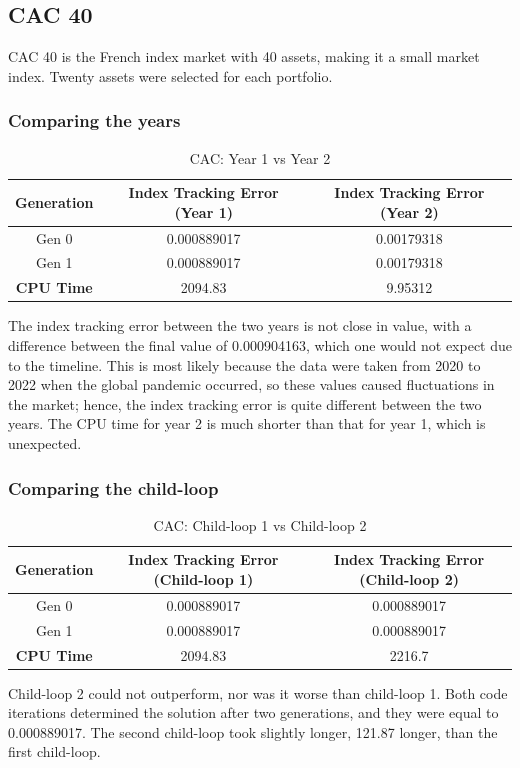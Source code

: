 \documentclass[12pt]{report}
\begin{document}
\subsection{CAC 40}
CAC 40 is the French index market with 40 assets, making it a small market index. Twenty assets were selected for each portfolio.
\subsubsection*{Comparing the years}
\begin{table}[!h]
\centering
\begin{tabular}{| c | c| c|} 
\hline \rowcolor{lightgray}
\textbf{Generation} & \textbf{Index Tracking Error (Year 1)} & \textbf{Index Tracking Error (Year 2)} \\
\hline
Gen 0 & 0.000889017 & 0.00179318\\ \hline
Gen 1 & 0.000889017 & 0.00179318\\ \hline
\textbf{CPU Time}& 2094.83 &  9.95312\\
\hline
\end{tabular}
\caption{CAC: Year 1 vs Year 2}
\label{table:cacyears}
\end{table}
\noindent %
The index tracking error between the two years is not close in value, with a difference between the final value of 0.000904163, which one would not expect due to the timeline. This is most likely because the data were taken from 2020 to 2022 when the global pandemic occurred, so these values caused fluctuations in the market; hence, the index tracking error is quite different between the two years. The CPU time for year 2 is much shorter than that for year 1, which is unexpected. %
\subsubsection*{Comparing the child-loop}
\begin{table}[h!]
\centering
\begin{tabular}{| c | c| c|} 
\hline
\rowcolor{lightgray}
\textbf{Generation} & \textbf{Index Tracking Error (Child-loop 1)} & \textbf{Index Tracking Error (Child-loop 2)} \\
\hline
Gen 0 & 0.000889017 & 0.000889017\\ \hline
Gen 1 & 0.000889017 & 0.000889017\\ \hline
\textbf{CPU Time}& 2094.83 &  2216.7\\
\hline
\end{tabular}
\caption{CAC: Child-loop 1 vs Child-loop 2}
\label{table:cacchild}
\end{table}
\noindent
Child-loop 2 could not outperform, nor was it worse than child-loop 1. Both code iterations determined the solution after two generations, and they were equal to 0.000889017. The second child-loop took slightly longer, 121.87 longer, than the first child-loop. %
\end{document}
